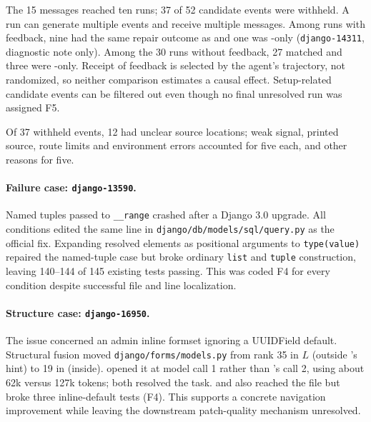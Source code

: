 The 15 messages reached ten runs; 37 of 52 candidate events were withheld. A run can
generate multiple events and receive multiple messages. Among runs with feedback, nine had the same
repair outcome as \condC{} and one was \condC{}-only (\texttt{django-14311}, diagnostic
note only). Among the 30 runs without feedback, 27 matched \condC{} and three were
\condC{}-only. Receipt of feedback is selected by the agent's trajectory, not randomized,
so neither comparison estimates a causal effect. Setup-related candidate events can be
filtered out even though no final unresolved run was assigned F5.


Of 37 withheld events, 12 had unclear source locations; weak signal, printed source,
route limits and environment errors accounted for five each, and other reasons for five.

\begin{samepage}
\paragraph{Failure case: \texttt{django-13590}.}
Named tuples passed to \texttt{\_\_range} crashed after a Django 3.0 upgrade. All conditions
edited the same line in \texttt{django/db/models/sql/query.py} as the official fix.
Expanding resolved elements as positional arguments to \texttt{type(value)} repaired the
named-tuple case but broke ordinary \texttt{list} and \texttt{tuple} construction, leaving
140--144 of 145 existing tests passing. This was coded F4 for every condition despite
successful file and line localization.

\end{samepage}
\begin{samepage}
\paragraph{Structure case: \texttt{django-16950}.}
The issue concerned an admin inline formset ignoring a UUIDField default. Structural
fusion moved \texttt{django/forms/models.py} from rank 35 in $L$ (outside \condB{}'s hint)
to 19 in \condC{} (inside). \condC{} opened it at model call 1 rather than \condB{}'s
call 2, using about 62k versus 127k tokens; both resolved the task. \condA{} and \condD{}
also reached the file but broke three inline-default tests (F4). This supports a concrete
navigation improvement while leaving the downstream patch-quality mechanism unresolved.

\end{samepage}
